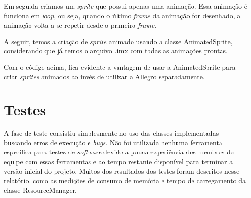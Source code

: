 %
Em seguida criamos um \textit{sprite} que possui apenas uma animação. Essa animação é funciona em \textit{loop}, ou seja, quando o último \textit{frame} da animação for desenhado, a animação volta a se repetir desde o primeiro \textit{frame}.
%

%
\par 
A seguir, temos a criação de \textit{sprite} animado usando a classe AnimatedSprite, considerando que já temos o arquivo .tmx com todas as animações prontas.
%

%
Com o código acima, fica evidente a vantagem de usar a AnimatedSprite para criar \textit{sprites} animados ao invés de utilizar a Allegro separadamente.
%
%
%
\section{Testes}
%
A fase de teste consistiu simplesmente no uso das classes implementadas buscando erros de execução e \textit{bugs}. Não foi utilizada nenhuma ferramenta específica para testes de \textit{software} devido a pouca experiência dos membros da equipe com essas ferramentas e ao tempo restante disponível para terminar a versão inicial do projeto. Muitos dos resultados dos testes foram descritos nesse relatório, como as medições de consumo de memória e tempo de carregamento da classe ResourceManager. 
%


